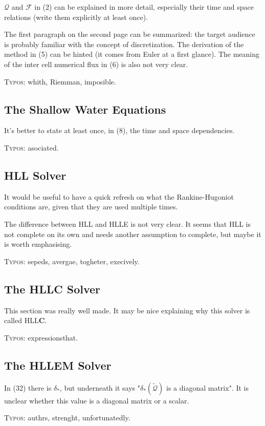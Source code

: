 \documentclass{scrartcl}
\begin{document}
$\mathcal{Q}$ and $\mathcal{F}$ in (2) can be explained in more detail, especially their time and space relations (write them explicitly at least once).

The first paragraph on the second page can be summarized: the target audience is probably familiar with the concept of discretization. The derivation of the method in (5) can be hinted (it comes from Euler at a first glance). The meaning of the inter cell numerical flux in (6) is also not very clear.

\textsc{Typos}: whith, Riemman, imposible.

\subsection{The Shallow Water Equations}

It's better to state at least once, in (8), the time and space dependencies.

\textsc{Typos}: asociated.

\subsection{HLL Solver}

It would be useful to have a quick refresh on what the Rankine-Hugoniot conditions are, given that they are used multiple times.

The difference between HLL and HLLE is not very clear. It seems that HLL is not complete on its own and needs another assumption to complete, but maybe it is worth emphasising.

\textsc{Typos}: sepeds, avergae, togheter, execively.

\subsection{The HLLC Solver}

This section was really well made. It may be nice explaining why this solver is called HLL\textbf{C}.

\textsc{Typos}: expressionsthat.

\subsection{The HLLEM Solver}

In (32) there is $\delta_*$, but underneath it says "$\delta_*(\tilde{\mathcal{Q}})$ is a diagonal matrix". It is unclear whether this value is a diagonal matrix or a scalar.

\textsc{Typos}: authrs, strenght, unfortunatedly.
\end{document}
